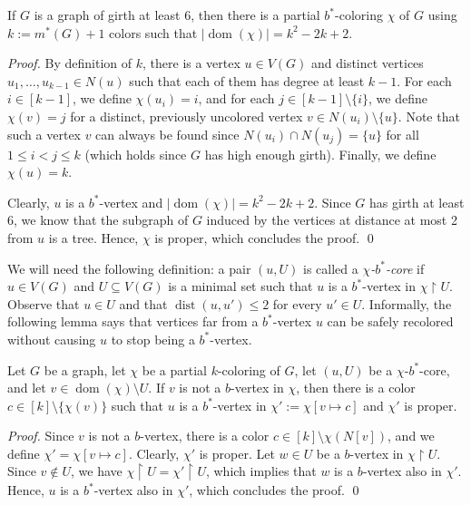 \documentclass[runningheads, envcountsame]{llncs}
\newcommand{\seq}{\subseteq}
\DeclareMathOperator{\dom}{dom}
\DeclareMathOperator{\dist}{dist}
\begin{document}
\begin{lemma}\label{lem:g6-init}
If $G$ is a graph of girth at least 6, then there is a partial $b^*$-coloring $\chi$ of $G$ using $k := m^*(G)+1$ colors such that $|\dom(\chi)| = k^2 -2k + 2$.
\end{lemma}
\begin{proof}
By definition of $k$, there is a vertex $u \in V(G)$ and distinct vertices $u_1, \ldots, u_{k-1} \in N(u)$ such that each of them has degree at least $k-1$.
For each $i \in [k-1]$, we define $\chi(u_i) = i$, and for each $j \in [k-1] \setminus \{i\}$, we define $\chi(v) = j$ for a distinct, previously uncolored vertex $v \in N(u_i) \setminus \{u\}$.
Note that such a vertex $v$ can always be found since $N(u_i) \cap N(u_j) = \{u\}$ for all $1 \le i < j \le k$ (which holds since $G$ has high enough girth).
Finally, we define $\chi(u) = k$.

Clearly, $u$ is a $b^*$-vertex and $|\dom(\chi)| = k^2 -2k + 2$.
Since $G$ has girth at least 6, we know that the subgraph of $G$ induced by the vertices at distance at most 2 from $u$ is a tree.
Hence, $\chi$ is proper, which concludes the proof.
\qed\end{proof}

We will need the following definition: a pair $(u, U)$ is called a \emph{$\chi$-$b^*$-core} if $u \in V(G)$ and $U \seq V(G)$ is a minimal set such that $u$ is a $b^*$-vertex in $\chi \upharpoonright U$.
Observe that $u \in U$ and that $\dist(u, u') \le 2$ for every $u' \in U$.
Informally, the following lemma says that vertices far from a $b^*$-vertex $u$ can be safely recolored without causing $u$ to stop being a $b^*$-vertex.

\begin{lemma}\label{lem:recolor}
Let $G$ be a graph, let $\chi$ be a partial $k$-coloring of $G$, let $(u, U)$ be a $\chi$-$b^*$-core, and let $v \in \dom(\chi) \setminus U$.
If $v$ is not a $b$-vertex in $\chi$, 
then there is a color $c \in [k] \setminus \{\chi(v)\}$ such that $u$ is a $b^*$-vertex in $\chi' := \chi[v \mapsto c]$ and $\chi'$ is proper.
\end{lemma}
\begin{proof}
Since $v$ is not a $b$-vertex, there is a color $c \in [k] \setminus \chi(N[v])$, and we define $\chi' = \chi[v \mapsto c]$.
Clearly, $\chi'$ is proper.
Let $w \in U$ be a $b$-vertex in $\chi \upharpoonright U$.
Since $v \notin U$, we have $\chi \upharpoonright U = \chi' \upharpoonright U$, which implies that $w$ is a $b$-vertex also in $\chi'$.
Hence, $u$ is a $b^*$-vertex also in $\chi'$, which concludes the proof.
\qed\end{proof}
\end{document}
